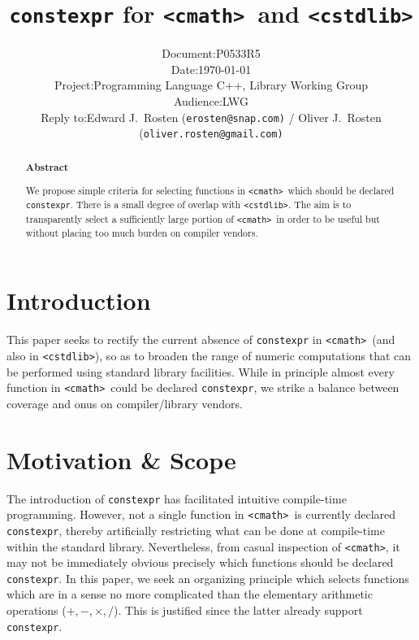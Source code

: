 \documentclass[prd,twocolumn,amsmath,amssymb,nofootinbib,eqsecnum]{revtex4-1}
\newcommand{\constexpr}{\code{constexpr}\xspace}
\newcommand{\code}[1]{{\tt #1}}
\newcommand{\header}[1]{{\tt <#1>}}
\newcommand{\cmath}{\header{cmath}}
\newcommand{\cstdlib}{\header{cstdlib}}
\newcommand{\Operators}{\ensuremath{+,-,\times,/}}
\begin{document}
\title{\constexpr for \cmath\ and \cstdlib}

\author{
\hspace{11.5em}
\begin{tabular}{ll}
	Document: & P0533R5
\\
	Date: & \today
\\
	Project: & Programming Language C++, Library Working Group
\\
	Audience: & LWG
\\
	Reply to: & Edward J.\ Rosten {(\tt erosten@snap.com)}
 / Oliver J.\ Rosten {(\tt oliver.rosten@gmail.com)}
\end{tabular}
}

\begin{abstract}

\begin{center} {\bf Abstract} \end{center}
We propose simple criteria for selecting functions in \cmath\ which should be
declared \constexpr. There is a small degree of overlap with \cstdlib.
 The aim is to transparently select a sufficiently large portion of \cmath\ 
in order to be useful but without placing too much burden on compiler vendors.
	
\end{abstract}


\maketitle

\tableofcontents

\section{Introduction}

This paper seeks to rectify the current absence of \constexpr in
\cmath\ (and also in \cstdlib), so as to broaden the range of numeric computations that can be
performed using standard library facilities. While in principle almost every function
in \cmath\ could be declared \constexpr, we strike a balance between coverage and onus on compiler/library vendors.


\section{Motivation \& Scope}

The introduction of \constexpr has facilitated intuitive compile-time
programming. However, not a single function in \cmath\ is currently declared \constexpr,
thereby artificially restricting what can be done at compile-time within the standard library.
Nevertheless, from casual inspection of \cmath, it may
not be immediately obvious precisely which functions should be declared
\constexpr. In this paper, we seek an organizing principle which selects functions
which are in a sense no more complicated than the elementary arithmetic operations
(\Operators). This is justified since the latter already support \constexpr.
\end{document}
